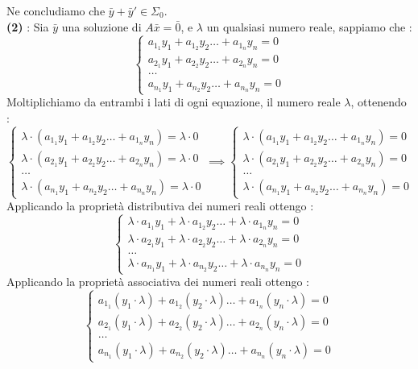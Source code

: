 \documentclass[12pt, letterpaper]{article}
\begin{document}
Ne concludiamo che \(\bar y +\bar y' \in \Sigma_0\).\\ 
\textbf{(2) }: 
Sia \(\bar y\) una soluzione di \(A\bar x = \bar 0\), e \(\lambda\) un qualsiasi numero reale, sappiamo che :\begin{equation}
    \begin{cases}
        a_{1_1}y_1+a_{1_2}y_2\dots+a_{1_n}y_n=0\\
        a_{2_1}y_1+a_{2_2}y_2\dots+a_{2_n}y_n=0\\\dots\\ 
        a_{n_1}y_1+a_{n_2}y_2\dots+a_{n_n}y_n=0
    \end{cases}
\end{equation}
Moltiplichiamo da entrambi i lati di ogni equazione, il numero reale \(\lambda\), ottenendo : \begin{equation}
    \begin{cases}
        \lambda\cdot(a_{1_1}y_1+a_{1_2}y_2\dots+a_{1_n}y_n)=\lambda\cdot0\\
        \lambda\cdot(a_{2_1}y_1+a_{2_2}y_2\dots+a_{2_n}y_n)=\lambda\cdot0\\\dots\\ 
        \lambda\cdot(a_{n_1}y_1+a_{n_2}y_2\dots+a_{n_n}y_n)=\lambda\cdot0
    \end{cases}\implies \begin{cases}
        \lambda\cdot(a_{1_1}y_1+a_{1_2}y_2\dots+a_{1_n}y_n)=0\\
        \lambda\cdot(a_{2_1}y_1+a_{2_2}y_2\dots+a_{2_n}y_n)=0\\\dots\\ 
        \lambda\cdot(a_{n_1}y_1+a_{n_2}y_2\dots+a_{n_n}y_n)=0
    \end{cases}
\end{equation}
Applicando la proprietà distributiva dei numeri reali ottengo : \begin{equation}
    \begin{cases}
        \lambda\cdot a_{1_1}y_1+ \lambda\cdot a_{1_2}y_2\dots+ \lambda\cdot a_{1_n}y_n=0\\
        \lambda\cdot a_{2_1}y_1+ \lambda\cdot a_{2_2}y_2\dots+ \lambda\cdot a_{2_n}y_n=0\\\dots\\ 
        \lambda\cdot a_{n_1}y_1+ \lambda\cdot a_{n_2}y_2\dots+ \lambda\cdot a_{n_n}y_n=0
    \end{cases}
\end{equation}
Applicando la proprietà associativa dei numeri reali ottengo : 
\begin{equation}
    \begin{cases}
        a_{1_1}(y_1\cdot \lambda)+a_{1_2}(y_2\cdot \lambda)\dots+a_{1_n}(y_n\cdot \lambda)=0\\
        a_{2_1}(y_1\cdot \lambda)+a_{2_2}(y_2\cdot \lambda)\dots+a_{2_n}(y_n\cdot \lambda)=0\\\dots\\ 
        a_{n_1}(y_1\cdot \lambda)+a_{n_2}(y_2\cdot \lambda)\dots+a_{n_n}(y_n\cdot \lambda)=0
    \end{cases}
\end{equation}
\end{document}
